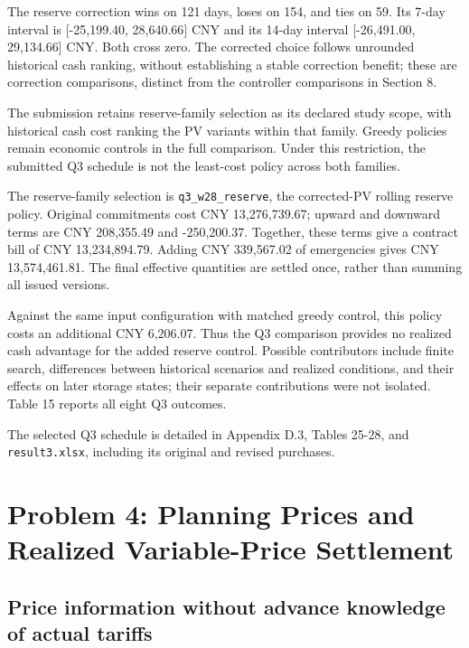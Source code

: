 The reserve correction wins on 121 days, loses on 154, and ties on 59. Its 7-day interval is {[}-25,199.40, 28,640.66{]} CNY and its 14-day interval {[}-26,491.00, 29,134.66{]} CNY. Both cross zero. The corrected choice follows unrounded historical cash ranking, without establishing a stable correction benefit; these are correction comparisons, distinct from the controller comparisons in Section 8.

The submission retains reserve-family selection as its declared study scope, with historical cash cost ranking the PV variants within that family. Greedy policies remain economic controls in the full comparison. Under this restriction, the submitted Q3 schedule is not the least-cost policy across both families.

The reserve-family selection is \nolinkurl{q3_w28_reserve}, the corrected-PV rolling reserve policy. Original commitments cost CNY 13,276,739.67; upward and downward terms are CNY 208,355.49 and -250,200.37. Together, these terms give a contract bill of CNY 13,234,894.79. Adding CNY 339,567.02 of emergencies gives CNY 13,574,461.81. The final effective quantities are settled once, rather than summing all issued versions.

Against the same input configuration with matched greedy control, this policy costs an additional CNY 6,206.07. Thus the Q3 comparison provides no realized cash advantage for the added reserve control. Possible contributors include finite search, differences between historical scenarios and realized conditions, and their effects on later storage states; their separate contributions were not isolated. Table 15 reports all eight Q3 outcomes.

The selected Q3 schedule is detailed in Appendix D.3, Tables 25-28, and \nolinkurl{result3.xlsx}, including its original and revised purchases.

\section{Problem 4: Planning Prices and Realized Variable-Price Settlement}\label{problem-4-planning-prices-and-realized-variable-price-settlement}

\subsection{Price information without advance knowledge of actual tariffs}\label{price-information-without-advance-knowledge-of-actual-tariffs}

